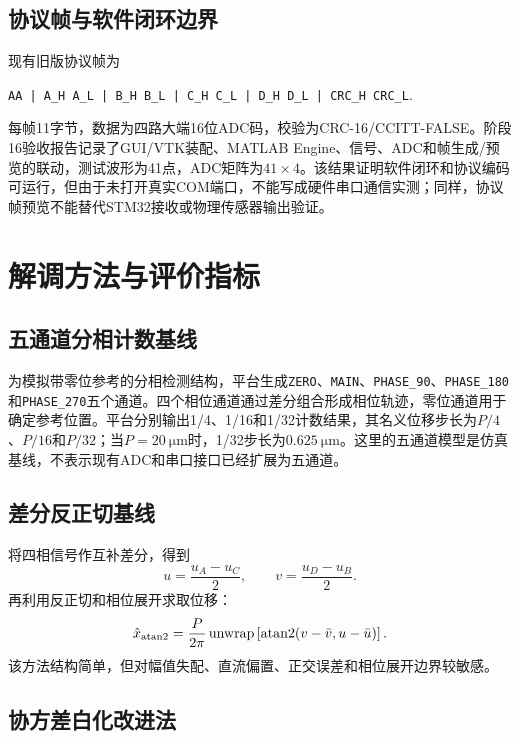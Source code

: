 \documentclass[UTF8,a4paper,12pt]{ctexart}
\begin{document}
\subsection{协议帧与软件闭环边界}

现有旧版协议帧为
\begin{center}
\texttt{AA | A\_H A\_L | B\_H B\_L | C\_H C\_L | D\_H D\_L | CRC\_H CRC\_L}.
\end{center}
每帧11字节，数据为四路大端16位ADC码，校验为CRC-16/CCITT-FALSE。阶段16验收报告记录了GUI/VTK装配、MATLAB Engine、信号、ADC和帧生成/预览的联动，测试波形为41点，ADC矩阵为$41\times4$。该结果证明软件闭环和协议编码可运行，但由于未打开真实COM端口，不能写成硬件串口通信实测；同样，协议帧预览不能替代STM32接收或物理传感器输出验证。

\section{解调方法与评价指标}

\subsection{五通道分相计数基线}

为模拟带零位参考的分相检测结构，平台生成\texttt{ZERO}、\texttt{MAIN}、\texttt{PHASE\_90}、\texttt{PHASE\_180}和\texttt{PHASE\_270}五个通道。四个相位通道通过差分组合形成相位轨迹，零位通道用于确定参考位置。平台分别输出1/4、1/16和1/32计数结果，其名义位移步长为$P/4$、$P/16$和$P/32$；当$P=20~\si{\micro\metre}$时，1/32步长为$0.625~\si{\micro\metre}$。这里的五通道模型是仿真基线，不表示现有ADC和串口接口已经扩展为五通道。

\subsection{差分反正切基线}

将四相信号作互补差分，得到
\begin{equation}
  u=\frac{u_A-u_C}{2},\qquad v=\frac{u_D-u_B}{2}.
  \label{eq:diff}
\end{equation}
再利用反正切和相位展开求取位移：
\begin{equation}
  \hat{x}_{\rm atan2}=\frac{P}{2\pi}\operatorname{unwrap}\left[\operatorname{atan2}(v-\bar v,u-\bar u)\right].
  \label{eq:atan2}
\end{equation}
该方法结构简单，但对幅值失配、直流偏置、正交误差和相位展开边界较敏感。

\subsection{协方差白化改进法}
\end{document}
